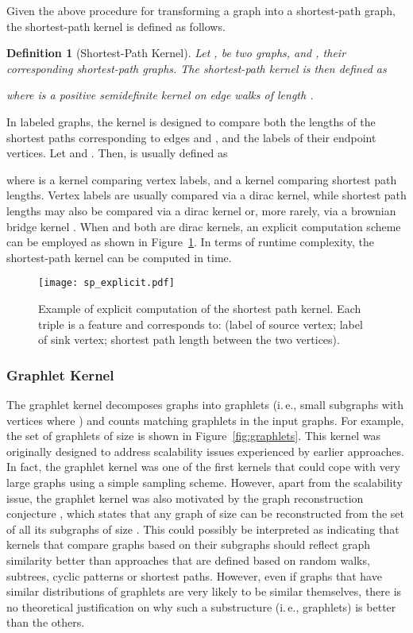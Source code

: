 \documentclass[twoside,11pt]{article}
\newcommand{\ie}{i.\,e., }
\newtheorem{definition}{Definition}
\begin{document}
Given the above procedure for transforming a graph into a shortest-path graph, the shortest-path kernel is defined as follows.
\begin{definition}[Shortest-Path Kernel]
  Let ,  be two graphs, and ,  their corresponding shortest-path graphs.
  The shortest-path kernel is then defined as
  
  where  is a positive semidefinite kernel on edge walks of length .
\end{definition}
In labeled graphs, the  kernel is designed to compare both the lengths of the shortest paths corresponding to edges  and , and the labels of their endpoint vertices.
Let  and .
Then,  is usually defined as

where  is a kernel comparing vertex labels, and  a kernel comparing shortest path lengths.
Vertex labels are usually compared via a dirac kernel, while shortest path lengths may also be compared via a dirac kernel or, more rarely, via a brownian bridge kernel .
When  and  both are dirac kernels, an explicit computation scheme can be employed as shown in Figure~\ref{fig:shortest_path}.
In terms of runtime complexity, the shortest-path kernel can be computed in  time.

\begin{figure}[t]
    \centering
    \texttt{[image: sp\_explicit.pdf]}
    \caption{Example of explicit computation of the shortest path kernel. Each triple is a feature and corresponds to: (label of source vertex; label of sink vertex; shortest path length between the two vertices).}
    \label{fig:shortest_path}
\end{figure}


\subsubsection{Graphlet Kernel}
The graphlet kernel decomposes graphs into graphlets (\ie small subgraphs with  vertices where )  and counts matching graphlets in the input graphs.
For example, the set of graphlets of size  is shown in Figure~\ref{fig:graphlets}.
This kernel was originally designed to address scalability issues experienced by earlier approaches.
In fact, the graphlet kernel was one of the first kernels that could cope with very large graphs using a simple sampling scheme.
However, apart from the scalability issue, the graphlet kernel was also motivated by the graph reconstruction conjecture , which states that any graph of size  can be reconstructed from the set of all its subgraphs of size .
This could possibly be interpreted as indicating that kernels that compare graphs based on their subgraphs should reflect graph similarity better than approaches that are defined based on random walks, subtrees, cyclic patterns or shortest paths.
However, even if graphs that have similar distributions of graphlets are very likely to be similar themselves, there is no theoretical justification on why such a substructure (\ie graphlets) is better than the others.
\end{document}
